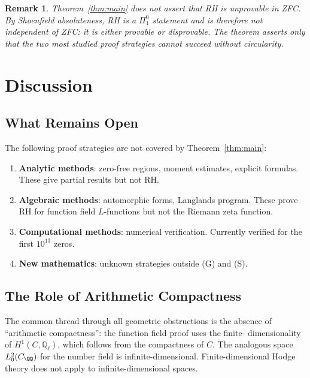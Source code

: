 \documentclass[12pt]{article}
\newtheorem{remark}[theorem]{Remark}
\begin{document}
\begin{remark}
Theorem~\ref{thm:main} does not assert that RH is unprovable in ZFC.
By Shoenfield absoluteness, RH is a $\Pi^0_1$ statement and is therefore
not independent of ZFC: it is either provable or disprovable. The theorem
asserts only that the two most studied proof strategies cannot succeed
without circularity.
\end{remark}

\section{Discussion}

\subsection{What Remains Open}

The following proof strategies are not covered by Theorem~\ref{thm:main}:

\begin{enumerate}
\item \textbf{Analytic methods}: zero-free regions, moment estimates,
explicit formulas. These give partial results but not RH.

\item \textbf{Algebraic methods}: automorphic forms, Langlands program.
These prove RH for function field $L$-functions but not the Riemann
zeta function.

\item \textbf{Computational methods}: numerical verification. Currently
verified for the first $10^{13}$ zeros.

\item \textbf{New mathematics}: unknown strategies outside (G) and (S).
\end{enumerate}

\subsection{The Role of Arithmetic Compactness}

The common thread through all geometric obstructions is the absence of
``arithmetic compactness'': the function field proof uses the finite-
dimensionality of $H^1(C, \mathbb{Q}_\ell)$, which follows from the
compactness of $C$. The analogous space $L^2_0(C_\QQ)$ for the number
field is infinite-dimensional. Finite-dimensional Hodge theory does not
apply to infinite-dimensional spaces.
\end{document}

